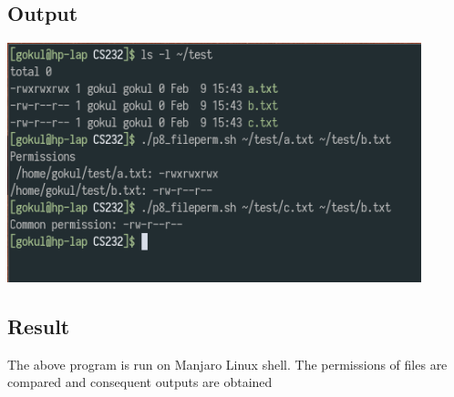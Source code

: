 \documentclass{article}
\begin{document}
\subsection{Output}
\includegraphics[width=0.9\textwidth]{img/p12.png}\newline

\subsection{Result}
The above program is run on Manjaro Linux shell. The permissions of files
are compared and consequent outputs are obtained
\end{document}
